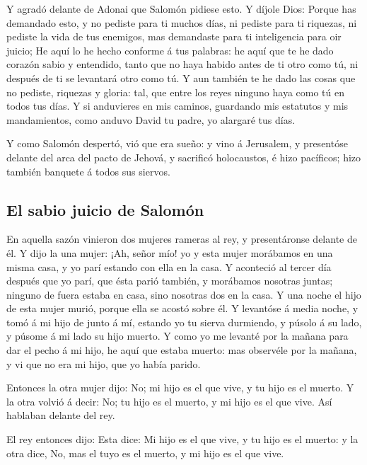  Y agradó delante de Adonai que Salomón pidiese esto.
 Y díjole Dios: Porque has demandado esto, y no pediste
para ti muchos días, ni pediste para ti riquezas, ni pediste la vida de
tus enemigos, mas demandaste para ti inteligencia para oir juicio;
 He aquí lo he hecho conforme á tus palabras: he aquí que
te he dado corazón sabio y entendido, tanto que no haya habido antes de
ti otro como tú, ni después de ti se levantará otro como tú.
 Y aun también te he dado las cosas que no pediste,
riquezas y gloria: tal, que entre los reyes ninguno haya como tú en
todos tus días.  Y si anduvieres en mis caminos,
guardando mis estatutos y mis mandamientos, como anduvo David tu padre,
yo alargaré tus días.

 Y como Salomón despertó, vió que era sueño: y vino á
Jerusalem, y presentóse delante del arca del pacto de Jehová, y
sacrificó holocaustos, é hizo pacíficos; hizo también banquete á todos
sus siervos.

\hypertarget{el-sabio-juicio-de-salomuxf3n}{%
\subsection{El sabio juicio de
Salomón}\label{el-sabio-juicio-de-salomuxf3n}}

 En aquella sazón vinieron dos mujeres rameras al rey, y
presentáronse delante de él.  Y dijo la una mujer: ¡Ah,
señor mío! yo y esta mujer morábamos en una misma casa, y yo parí
estando con ella en la casa.  Y aconteció al tercer día
después que yo parí, que ésta parió también, y morábamos nosotras
juntas; ninguno de fuera estaba en casa, sino nosotras dos en la casa.
 Y una noche el hijo de esta mujer murió, porque ella se
acostó sobre él.  Y levantóse á media noche, y tomó á mi
hijo de junto á mí, estando yo tu sierva durmiendo, y púsolo á su lado,
y púsome á mi lado su hijo muerto.  Y como yo me levanté
por la mañana para dar el pecho á mi hijo, he aquí que estaba muerto:
mas observéle por la mañana, y vi que no era mi hijo, que yo había
parido.

 Entonces la otra mujer dijo: No; mi hijo es el que vive,
y tu hijo es el muerto. Y la otra volvió á decir: No; tu hijo es el
muerto, y mi hijo es el que vive. Así hablaban delante del rey.

 El rey entonces dijo: Esta dice: Mi hijo es el que vive,
y tu hijo es el muerto: y la otra dice, No, mas el tuyo es el muerto, y
mi hijo es el que vive.


